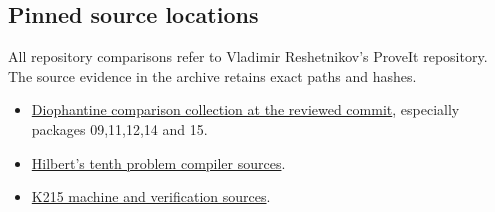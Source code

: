 \documentclass[11 pt]{article}
\begin{document}
\subsection*{Pinned source locations}
All repository comparisons refer to Vladimir Reshetnikov's ProveIt repository. The source evidence in the archive retains exact paths and hashes.
\begin{itemize}
\item \href{https://github.com/VladimirReshetnikov/ProveIt/tree/f0ae4e0991ca44a7bb4e5671d42e33d775e48035/SetTheory/Cardinals/docs/reports/hilbert-tenth-problem/con-zfc-diophantine-forms}{Diophantine comparison collection at the reviewed commit}, especially packages 09,11,12,14 and 15.
\item \href{https://github.com/VladimirReshetnikov/ProveIt/tree/f0ae4e0991ca44a7bb4e5671d42e33d775e48035/Computability/HilbertTenthProblem}{Hilbert's tenth problem compiler sources}.
\item \href{https://github.com/VladimirReshetnikov/ProveIt/tree/f0ae4e0991ca44a7bb4e5671d42e33d775e48035/Computability/BusyBeaver/Research/ZFC/k225-formal/verification/k215}{K215 machine and verification sources}.
\end{itemize}
\end{document}
